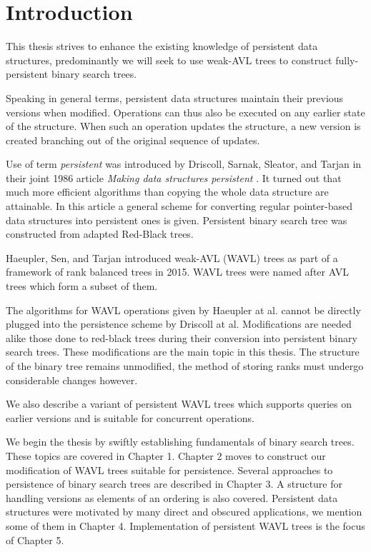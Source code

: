 \chapter*{Introduction}

This thesis strives to enhance the existing knowledge of persistent data structures, predominantly we will seek to use weak-AVL trees to construct fully-persistent binary search trees.

Speaking in general terms, persistent data structures maintain their previous versions when modified. Operations can thus also be executed on any earlier state of the structure. When such an operation updates the structure, a new version is created branching out of the original sequence of updates.

Use of term \emph{persistent} was introduced by Driscoll, Sarnak, Sleator, and Tarjan in their joint 1986 article \emph{Making data structures persistent} \cite{persistence-DSST}. It turned out that much more efficient algorithms than copying the whole data structure are attainable. In this article a general scheme for converting regular pointer-based data structures into persistent ones is given. Persistent binary search tree was constructed from adapted Red-Black trees.

Haeupler, Sen, and Tarjan \cite{weight-balanced} introduced weak-AVL (WAVL) trees as part of a framework of rank balanced trees in 2015. WAVL trees were named after AVL trees which form a subset of them.

The algorithms for WAVL operations given by Haeupler at al. cannot be directly plugged into the persistence scheme by Driscoll at al. Modifications are needed alike those done to red-black trees during their conversion into persistent binary search trees. These modifications are the main topic in this thesis. The structure of the binary tree remains unmodified, the method of storing ranks must undergo considerable changes however.

We also describe a variant of persistent WAVL trees which supports queries on earlier versions and is suitable for concurrent operations.

We begin the thesis by swiftly establishing fundamentals of binary search trees. These topics are covered in Chapter 1. Chapter 2 moves to construct our modification of WAVL trees suitable for persistence. Several approaches to persistence of binary search trees are described in Chapter 3. A structure for handling versions as elements of an ordering is also covered. Persistent data structures were motivated by many direct and obscured applications, we mention some of them in Chapter 4. Implementation of persistent WAVL trees is the focus of Chapter 5.

